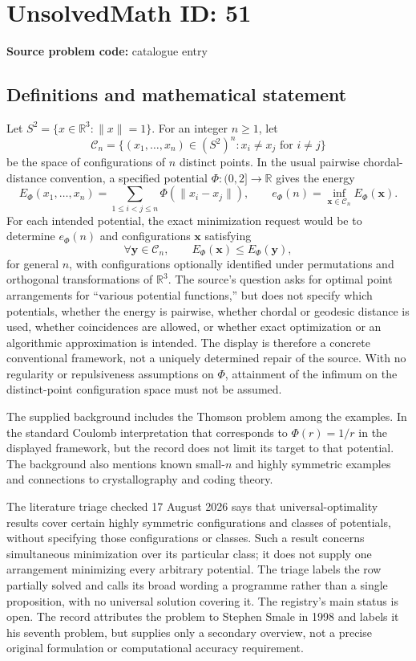 \documentclass[11pt]{article}
\newcommand{\R}{\mathbb{R}}
\begin{document}
\section*{UnsolvedMath ID: 51}
\textbf{Source problem code:} catalogue entry
\subsection{Definitions and mathematical statement}
Let $S^2=\{x\in\R^3:\|x\|=1\}$. For an integer $n\ge1$, let
\[
 \mathcal C_n=\{(x_1,\ldots,x_n)\in(S^2)^n:x_i\ne x_j\text{ for }i\ne j\}
\]
be the space of configurations of $n$ distinct points. In the usual pairwise chordal-distance convention, a specified potential $\Phi:(0,2]\to\R$ gives the energy
\[
 E_\Phi(x_1,\ldots,x_n)=\sum_{1\le i<j\le n}\Phi(\|x_i-x_j\|),\qquad
 e_\Phi(n)=\inf_{\mathbf x\in\mathcal C_n}E_\Phi(\mathbf x).
\]
For each intended potential, the exact minimization request would be to determine $e_\Phi(n)$ and configurations $\mathbf x$ satisfying
\[
 \forall\mathbf y\in\mathcal C_n,\qquad
 E_\Phi(\mathbf x)\le E_\Phi(\mathbf y),
\]
for general $n$, with configurations optionally identified under permutations and orthogonal transformations of $\R^3$. The source's question asks for optimal point arrangements for ``various potential functions,'' but does not specify which potentials, whether the energy is pairwise, whether chordal or geodesic distance is used, whether coincidences are allowed, or whether exact optimization or an algorithmic approximation is intended. The display is therefore a concrete conventional framework, not a uniquely determined repair of the source. With no regularity or repulsiveness assumptions on $\Phi$, attainment of the infimum on the distinct-point configuration space must not be assumed.

The supplied background includes the Thomson problem among the examples. In the standard Coulomb interpretation that corresponds to $\Phi(r)=1/r$ in the displayed framework, but the record does not limit its target to that potential. The background also mentions known small-$n$ and highly symmetric examples and connections to crystallography and coding theory.

The literature triage checked 17 August 2026 says that universal-optimality results cover certain highly symmetric configurations and classes of potentials, without specifying those configurations or classes. Such a result concerns simultaneous minimization over its particular class; it does not supply one arrangement minimizing every arbitrary potential. The triage labels the row partially solved and calls its broad wording a programme rather than a single proposition, with no universal solution covering it. The registry's main status is open. The record attributes the problem to Stephen Smale in 1998 and labels it his seventh problem, but supplies only a secondary overview, not a precise original formulation or computational accuracy requirement.
\end{document}
